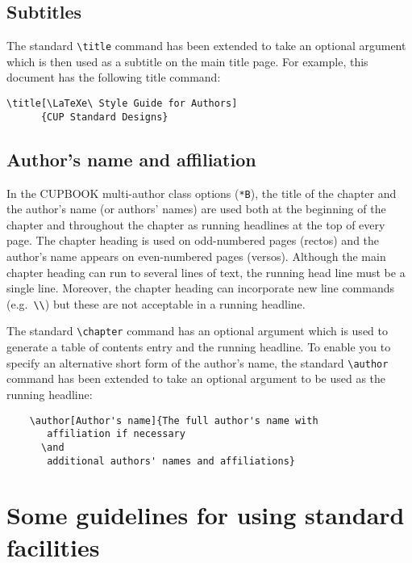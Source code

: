 \documentclass[cup6a]{cupbook}
\begin{document}
\subsection{Subtitles}

The standard \verb"\title" command has been extended to take an optional
argument which is then used as a subtitle on the main title page.
For example, this document has the following title command:
\begin{verbatim}
\title[\LaTeXe\ Style Guide for Authors]
      {CUP Standard Designs}
\end{verbatim}

\subsection{Author's name and affiliation}

In the CUPBOOK multi-author class options (\verb"*B"), the title of the
chapter and the author's name (or authors' names) are used both at the
beginning of the chapter and throughout the chapter as running headlines at the
top of every page. The chapter heading is used on odd-numbered pages (rectos)
and the author's name appears on even-numbered pages (versos). Although the
main chapter heading can run to several lines of text, the running head line
must be a single line. Moreover, the chapter heading can incorporate new line
commands (e.g.\ \verb"\\") but these are not acceptable in a running headline.

The standard \verb"\chapter" command has an optional argument which is used to
generate a table of contents entry and the running headline.
To enable you to specify an alternative short form of the author's name, the
standard \verb"\author" command has been extended to take an optional argument
to be used as the running headline:
\begin{verbatim}
    \author[Author's name]{The full author's name with
       affiliation if necessary
      \and
       additional authors' names and affiliations}
\end{verbatim}

\section{Some guidelines for using standard facilities}
\end{document}
